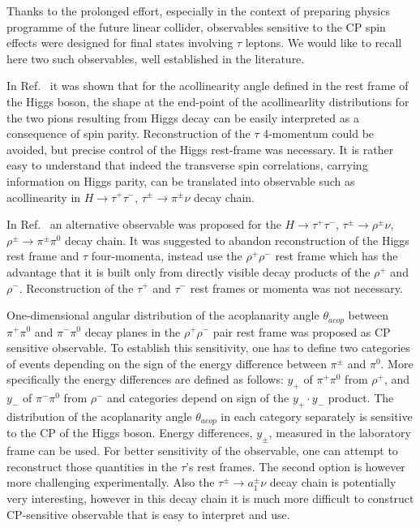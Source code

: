 \documentclass[12pt]{article}
\begin{document}
Thanks to the prolonged effort, especially in the context of preparing physics programme 
of the future linear collider, observables sensitive to the CP spin effects were designed for 
final states involving $\tau$ leptons. We would like to recall here two such observables, 
well established in the literature. 

In Ref.~\cite{Kramer:1994jn} it was shown that for the acollinearity angle defined in the rest frame 
of the Higgs boson,  the shape at the end-point of the acollinearlity 
distributions for the two pions resulting from Higgs decay can be easily interpreted as
a consequence of spin parity. Reconstruction of the $\tau$ 4-momentum could be avoided,
but precise control of the Higgs rest-frame was necessary. 
It is rather easy to understand that indeed the 
transverse spin correlations, carrying information on Higgs parity, 
can be translated into observable such as acollinearity in $H \to \tau^+ \tau^-$, 
$\tau^\pm \to \pi^\pm \nu$ decay chain.  

In Ref.~\cite{Bower:2002zx} an alternative observable was proposed for 
 the $H \to \tau^+ \tau^-$, $\tau^\pm \to \rho^\pm \nu$,
$\rho^\pm \to \pi^\pm \pi^0$ decay chain. It was suggested to abandon reconstruction of the 
Higgs rest frame and $\tau$ four-momenta, instead use the $\rho^+ \rho^-$ rest frame which has the advantage
that it is built only from directly visible decay products of the  $\rho^+$ and $ \rho^-$. 
Reconstruction of the $\tau^+$ and  $\tau^-$ rest frames or momenta was not necessary.


One-dimensional angular distribution of the acoplanarity angle $\theta_{acop}$ 
between $\pi^+ \pi^0$  and $\pi^- \pi^0$ decay planes in the $\rho^+ \rho^-$ pair rest 
frame was proposed as CP sensitive observable. To establish this sensitivity, one has to define two categories
of events depending on the sign of the energy difference between $\pi^\pm$ and $ \pi^0$.
More specifically  the energy differences are defined as follows: 
 $y_+$  of $\pi^+ \pi^0$ from $\rho^+$, and $y_-$ 
of $\pi^- \pi^0$ from $\rho^-$ and categories depend on sign of the $y_+ \cdot y_- $  product.
The distribution of  the acoplanarity angle $\theta_{acop}$  
in each category separately is sensitive to the CP of the Higgs boson. 
Energy differences,  $y_\pm$,  measured in the laboratory frame can be used. 
For better sensitivity of the observable, one can attempt to reconstruct those quantities in 
 the $\tau$'s rest frames. The second option is however more challenging experimentally. Also
the  $\tau^\pm \to a_1^\pm \nu$ decay chain is potentially very interesting, however 
in this decay chain it is much more difficult to construct CP-sensitive observable that is easy to interpret and use.
\end{document}
